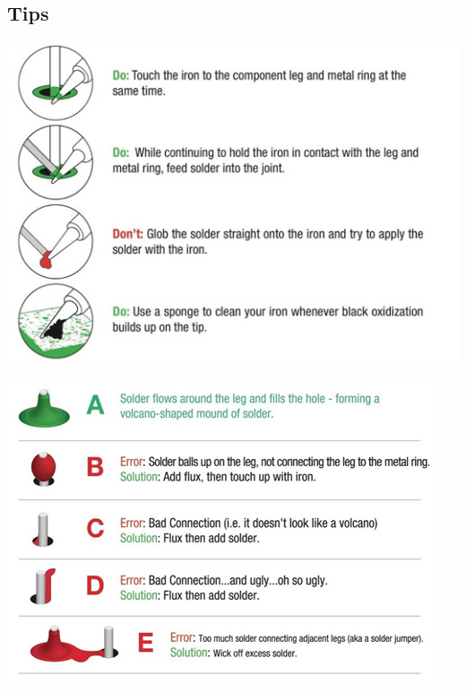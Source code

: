 \documentclass{guide}
\begin{document}
\subsection{Tips}
\begin{minipage}{.50\textwidth}
  \includegraphics[width=\textwidth]{images/dosanddonts.png}
  \label{fig:1}
\end{minipage}
\begin{minipage}{.50\textwidth}
  \includegraphics[width=\textwidth]{images/correct_joint.png}
  \label{fig:2}
\end{minipage}
\end{document}
